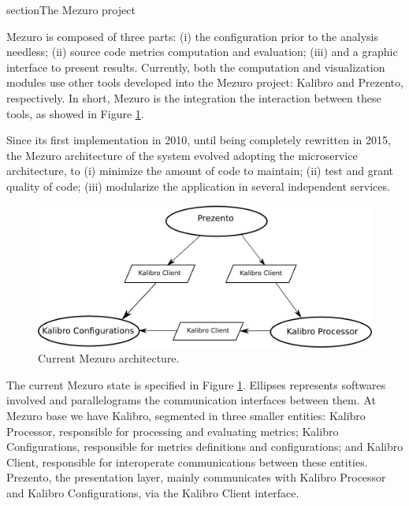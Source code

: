 section{The Mezuro project}
\label{sec:mezuro}

Mezuro is composed of three parts:
(i) the configuration prior to the analysis needless;
(ii) source code metrics computation and evaluation;
(iii) and a graphic interface to present results.
%
Currently, both the computation and visualization modules use other tools
developed into the Mezuro project: Kalibro and Prezento, respectively. In
short, Mezuro is the integration the interaction between these tools, as showed
in Figure \ref{fig:architecture-2}.

Since its first implementation in 2010\cite{mezuro2012}, until being completely
rewritten in 2015, the Mezuro architecture of the system evolved adopting the
microservice architecture\cite{namiot2014micro}, to (i) minimize the amount of
code to maintain; (ii) test and grant quality of code; (iii) modularize the
application in several independent services.

\begin{figure}[hbt]
  \centering
    \includegraphics[width=.8\linewidth]{images/mezuro-architecturev3.png}
  \caption{Current Mezuro architecture.}
  \label{fig:architecture-2}
\end{figure}

The current Mezuro state is specified in Figure \ref{fig:architecture-2}.
Ellipses represents softwares involved and parallelograms the communication
interfaces between them. At Mezuro base we have Kalibro, segmented in three
smaller entities: Kalibro Processor, responsible for processing and evaluating
metrics; Kalibro Configurations, responsible for metrics definitions and
configurations; and Kalibro Client, responsible for interoperate communications
between these entities.  Prezento, the presentation layer, mainly communicates
with Kalibro Processor and Kalibro Configurations, via the Kalibro Client
interface.

